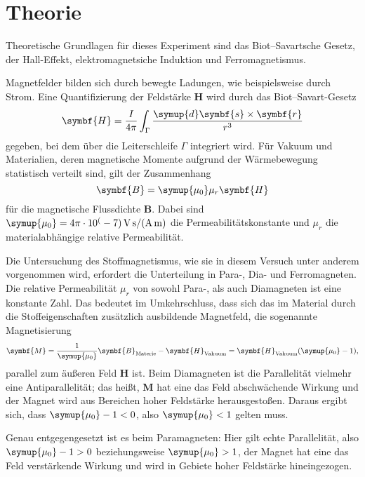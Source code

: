 \section{Theorie}
\label{sec:Theorie}
Theoretische Grundlagen für dieses Experiment sind das Biot--Savartsche Gesetz, der Hall-Effekt, elektromagnetsiche Induktion und Ferromagnetismus.

Magnetfelder bilden sich durch bewegte Ladungen, wie beispielsweise durch Strom. 
Eine Quantifizierung der Feldstärke $\symbf{H}$ wird durch das Biot--Savart-Gesetz 
\begin{equation}
\symbf{H}=\frac{I}{4\pi}\int_\Gamma \frac{\symup{d}\symbf{s}\times\symbf{r}}{r^3}
\label{eqn:biotsavart}
\end{equation}
gegeben, bei dem über die Leiterschleife $\Gamma$ integriert wird.
Für Vakuum und Materialien, deren magnetische Momente aufgrund der Wärmebewegung statistisch verteilt sind, gilt der 
Zusammenhang 
\begin{equation}
\symbf{B}=\symup{\mu_0}\mu_r\symbf{H}
\end{equation}
für die magnetische Flussdichte $\symbf{B}$. 
Dabei sind $\symup{\mu_0}=4\pi \cdot 10^(-7) \, \si{\volt\second\ampere\tothe{-1}\meter\tothe{-1}}$ die Permeabilitätskonstante 
und $\mu_r$ die materialabhängige relative Permeabilität.

Die Untersuchung des Stoffmagnetismus, wie sie in diesem Versuch unter anderem vorgenommen wird, erfordert die Unterteilung 
in Para-, Dia- und Ferromagneten. 
Die relative Permeabilität $\mu_r$ von sowohl Para-, als auch Diamagneten ist eine konstante Zahl. 
Das bedeutet im Umkehrschluss, dass sich das im Material durch die Stoffeigenschaften zusätzlich ausbildende Magnetfeld, die 
sogenannte Magnetisierung 
\begin{equation}
\symbf{M}=\frac{1}{\symup{\mu_0}}\symbf{B}_\text{Materie}-\symbf{H}_\text{Vakuum}=\symbf{H}_\text{Vakuum}(\symup{\mu_0}-1) \text{,} 
\label{eqn:Magnetisierung}
\end{equation}
parallel zum äußeren Feld $\symbf{H}$ ist. 
Beim Diamagneten ist die Parallelität vielmehr eine Antiparallelität; das heißt, $\symbf{M}$ hat eine das Feld
abschwächende Wirkung und der Magnet wird aus Bereichen hoher Feldstärke herausgestoßen. 
Daraus ergibt sich, dass $\symup{\mu_0}-1 < 0$, also $\symup{\mu_0}<1$ gelten muss. 

Genau entgegengesetzt ist es beim Paramagneten: Hier gilt echte Parallelität, also $\symup{\mu_0}-1 > 0$ beziehungsweise 
$\symup{\mu_0}> 1$, der Magnet hat eine das Feld verstärkende Wirkung und wird in Gebiete hoher Feldstärke hineingezogen.

